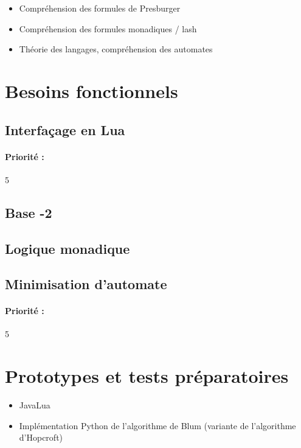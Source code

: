 \documentclass{article}%
\begin{document}
\begin{itemize}
  \item Compr\'ehension des formules de Presburger
  \item Compr\'ehension des formules monadiques / lash
  \item Th\'eorie des langages, compr\'ehension des automates
\end{itemize}

\section{Besoins fonctionnels}

\subsection{Interfaçage en Lua}

\paragraph{Priorité :} 5

\subsection{Base -2}


\subsection{Logique monadique}

\subsection{Minimisation d'automate}

\paragraph{Priorité :} 5

\section{Prototypes et tests pr\'eparatoires}

\begin{itemize}
  \item JavaLua
  \item Impl\'ementation Python de l'algorithme de Blum (variante de l'algorithme d'Hopcroft)
\end{itemize}
\end{document}
